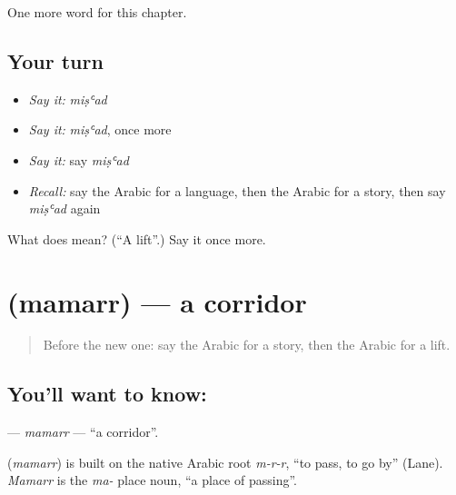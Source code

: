 \begin{grammarlens}[title={What you've built}]
One more word for this chapter.
\end{grammarlens}

\subsection*{Your turn}
\begin{itemize}
\raggedright
  \item \emph{Say it:} \emph{miṣʿad}
  \item \emph{Say it:} \emph{miṣʿad}, once more
  \item \emph{Say it:} say \emph{miṣʿad}
  \item \emph{Recall:} say the Arabic for a language, then the Arabic for a story, then say \emph{miṣʿad} again
\end{itemize}

\begin{tcolorbox}[breakable,colback=teal!4,colframe=teal!35!black,title={Before you move on}]
What does  mean? (\textquotedblleft{}A lift\textquotedblright{}.) Say it once more.
\end{tcolorbox}
\section[\texorpdfstring{\ar{ممر} (mamarr)}{ممر (mamarr)}]{ (mamarr) — a corridor}

\label{lesson:AR-C100-mamarr}



\begin{quote}
Before the new one: say the Arabic for a story, then the Arabic for a lift.
\end{quote}

\subsection*{You'll want to know: }
\textbf{} — \emph{mamarr} — \textquotedblleft{}a corridor\textquotedblright{}.

\begin{cousinweb}
\textbf{} (\emph{mamarr}) is built on the native Arabic root \emph{m-r-r}, \textquotedblleft{}to pass, to go by\textquotedblright{} (Lane). \emph{Mamarr} is the \emph{ma-} place noun, \textquotedblleft{}a place of passing\textquotedblright{}.
\end{cousinweb}

